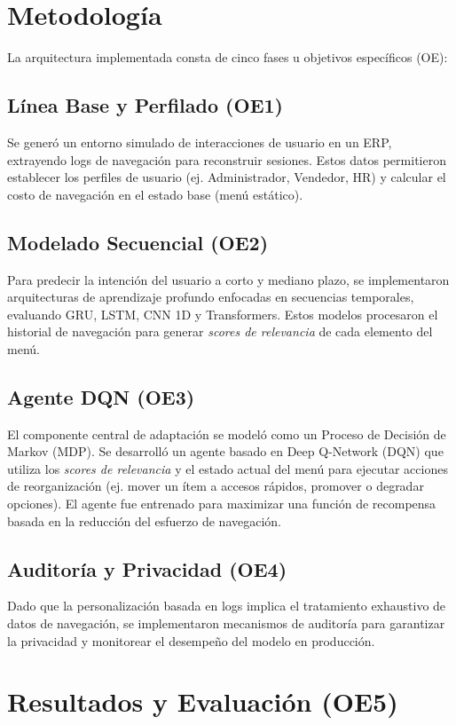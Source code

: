 \documentclass[conference]{IEEEtran}
\begin{document}
\section{Metodología}

La arquitectura implementada consta de cinco fases u objetivos específicos (OE):

\subsection{Línea Base y Perfilado (OE1)}
Se generó un entorno simulado de interacciones de usuario en un ERP, extrayendo logs de navegación para reconstruir sesiones. Estos datos permitieron establecer los perfiles de usuario (ej. Administrador, Vendedor, HR) y calcular el costo de navegación en el estado base (menú estático).

\subsection{Modelado Secuencial (OE2)}
Para predecir la intención del usuario a corto y mediano plazo, se implementaron arquitecturas de aprendizaje profundo enfocadas en secuencias temporales, evaluando GRU, LSTM, CNN 1D y Transformers. Estos modelos procesaron el historial de navegación para generar \textit{scores de relevancia} de cada elemento del menú.

\subsection{Agente DQN (OE3)}
El componente central de adaptación se modeló como un Proceso de Decisión de Markov (MDP). Se desarrolló un agente basado en Deep Q-Network (DQN) que utiliza los \textit{scores de relevancia} y el estado actual del menú para ejecutar acciones de reorganización (ej. mover un ítem a accesos rápidos, promover o degradar opciones). El agente fue entrenado para maximizar una función de recompensa basada en la reducción del esfuerzo de navegación.

\subsection{Auditoría y Privacidad (OE4)}
Dado que la personalización basada en logs implica el tratamiento exhaustivo de datos de navegación, se implementaron mecanismos de auditoría para garantizar la privacidad y monitorear el desempeño del modelo en producción.

\section{Resultados y Evaluación (OE5)}
\end{document}
